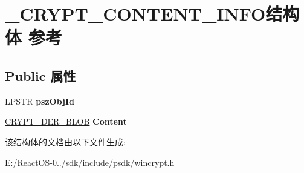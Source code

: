 \hypertarget{struct___c_r_y_p_t___c_o_n_t_e_n_t___i_n_f_o}{}\section{\+\_\+\+C\+R\+Y\+P\+T\+\_\+\+C\+O\+N\+T\+E\+N\+T\+\_\+\+I\+N\+F\+O结构体 参考}
\label{struct___c_r_y_p_t___c_o_n_t_e_n_t___i_n_f_o}
\subsection*{Public 属性}
\begin{DoxyCompactItemize}
\item 
\mbox{\label{struct___c_r_y_p_t___c_o_n_t_e_n_t___i_n_f_o_ae61489ea555935c02e5be94ecb6d43ad}} 
L\+P\+S\+TR {\bfseries psz\+Obj\+Id}
\item 
\mbox{\label{struct___c_r_y_p_t___c_o_n_t_e_n_t___i_n_f_o_a6ba2bcbe9e2e2681ca0eae87331026ac}} 
\hyperlink{struct___c_r_y_p_t_o_a_p_i___b_l_o_b}{C\+R\+Y\+P\+T\+\_\+\+D\+E\+R\+\_\+\+B\+L\+OB} {\bfseries Content}
\end{DoxyCompactItemize}


该结构体的文档由以下文件生成\+:\begin{DoxyCompactItemize}
\item 
E\+:/\+React\+O\+S-\/0../sdk/include/psdk/wincrypt.\+h\end{DoxyCompactItemize}
